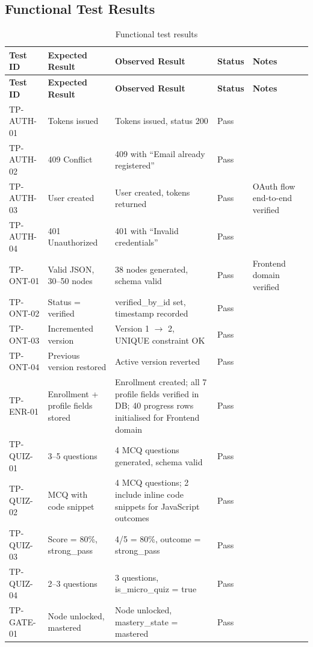 \subsection{Functional Test Results}

\begin{longtable}{p{1.8cm}p{2.5cm}p{2.5cm}p{3cm}p{1.2cm}p{2.5cm}}
\caption{Functional test results}
\label{tab:func-results}\\
\toprule
\textbf{Test ID} & \textbf{Expected Result} & \textbf{Observed Result} & \textbf{Status} & \textbf{Notes} \\
\midrule
\endfirsthead
\toprule
\textbf{Test ID} & \textbf{Expected Result} & \textbf{Observed Result} & \textbf{Status} & \textbf{Notes} \\
\midrule
\endhead
TP-AUTH-01 & Tokens issued & Tokens issued, status 200 & Pass & \\
TP-AUTH-02 & 409 Conflict & 409 with ``Email already registered'' & Pass & \\
TP-AUTH-03 & User created & User created, tokens returned & Pass & OAuth flow end-to-end verified \\
TP-AUTH-04 & 401 Unauthorized & 401 with ``Invalid credentials'' & Pass & \\
TP-ONT-01 & Valid JSON, 30--50 nodes & 38 nodes generated, schema valid & Pass & Frontend domain verified \\
TP-ONT-02 & Status = verified & verified\_by\_id set, timestamp recorded & Pass & \\
TP-ONT-03 & Incremented version & Version 1 $\rightarrow$ 2, UNIQUE constraint OK & Pass & \\
TP-ONT-04 & Previous version restored & Active version reverted & Pass & \\
TP-ENR-01 & Enrollment + profile fields stored & Enrollment created; all 7 profile fields verified in DB; 40 progress rows initialised for Frontend domain & Pass & \\
TP-QUIZ-01 & 3--5 questions & 4 MCQ questions generated, schema valid & Pass & \\
TP-QUIZ-02 & MCQ with code snippet & 4 MCQ questions; 2 include inline code snippets for JavaScript outcomes & Pass & \\
TP-QUIZ-03 & Score = 80\%, strong\_pass & 4/5 = 80\%, outcome = strong\_pass & Pass & \\
TP-QUIZ-04 & 2--3 questions & 3 questions, is\_micro\_quiz = true & Pass & \\
TP-GATE-01 & Node unlocked, mastered & Node unlocked, mastery\_state = mastered & Pass & \\

\end{longtable}
